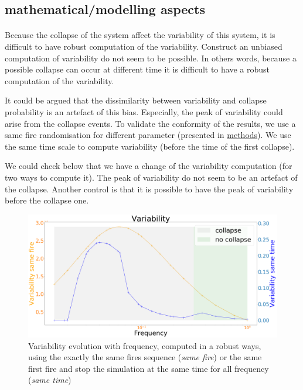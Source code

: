 \documentclass{article}
\begin{document}




\subsection{ mathematical/modelling aspects}






\paragraph{}
Because the collapse of the system affect the variability of this system, it is difficult to have robust computation of the variability. Construct an unbiased computation of variability do not seem to be possible. In others words, because a possible collapse can occur at different time it is difficult to have a robust computation of the variability.

It could be argued that the dissimilarity between variability and collapse probability is an artefact of this bias. Especially, the peak of variability could arise from the collapse events. To validate the conformity of the results, we use a same fire randomisation for different parameter (presented in \hyperref[same_fire]{methods}). We use the same time scale to compute variability (before the time of the first collapse). 

We could check below that we have a change of the variability computation (for two ways to compute it). The peak of variability do not seem to be an artefact of the collapse. Another control is that it is possible to have the peak of variability before the collapse one.

\begin{figure}[h]
\begin{center}
\includegraphics[width=12cm]{same_fire.png}
\end{center}
\caption{\label{fig:temp}Variability evolution with frequency, computed in a robust ways, using the exactly the same fires sequence (\textit{same fire}) or the same first fire and stop the simulation at the same time for all frequency (\textit{same time})}
\end{figure}
\end{document}
